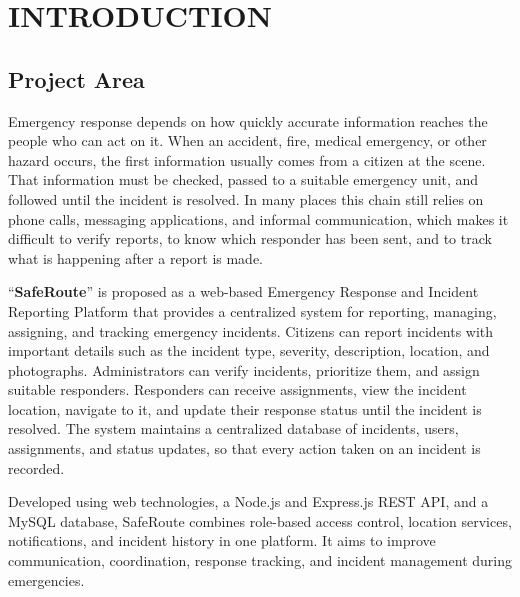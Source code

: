 \documentclass[a4paper,12pt]{report}
\begin{document}
	\chapter{INTRODUCTION}
	
	\section{Project Area}
	\par
	Emergency response depends on how quickly accurate information reaches the people who can act on it. When an accident, fire, medical emergency, or other hazard occurs, the first information usually comes from a citizen at the scene. That information must be checked, passed to a suitable emergency unit, and followed until the incident is resolved. In many places this chain still relies on phone calls, messaging applications, and informal communication, which makes it difficult to verify reports, to know which responder has been sent, and to track what is happening after a report is made.
	
	``\textbf{SafeRoute}'' is proposed as a web-based Emergency Response and Incident Reporting Platform that provides a centralized system for reporting, managing, assigning, and tracking emergency incidents. Citizens can report incidents with important details such as the incident type, severity, description, location, and photographs. Administrators can verify incidents, prioritize them, and assign suitable responders. Responders can receive assignments, view the incident location, navigate to it, and update their response status until the incident is resolved. The system maintains a centralized database of incidents, users, assignments, and status updates, so that every action taken on an incident is recorded.
	
	Developed using web technologies, a Node.js and Express.js REST API, and a MySQL database, SafeRoute combines role-based access control, location services, notifications, and incident history in one platform. It aims to improve communication, coordination, response tracking, and incident management during emergencies.
	
\end{document}
